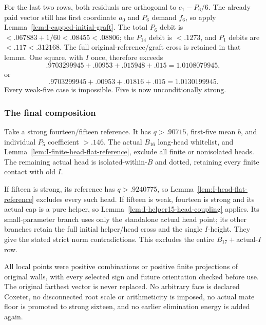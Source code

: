 For the last two rows, both residuals are orthogonal to
\(e_1-P_6/6\). The already paid vector still has first coordinate
\(a_0\) and \(P_6\) demand \(f_6\), so apply
Lemma~\ref{lem:I-capped-initial-graft}.
The total \(P_6\) debit is
\(<.067883+1/60<.08455<.08806\); the \(P_{14}\) debit
is \(<.1273\), and \(P_1\) debits are \(<.117<.312168\).
The full original-reference/graft cross is retained in that lemma.
One square, with \(I\) once, therefore exceeds
\[
 .9703299945+.00953+.015948+.015=1.0108079945,
\]
or
\[
 .9703299945+.00953+.01816+.015=1.0130199945.
\]
Every weak-five case is impossible. Five is now unconditionally strong.

\subsubsection{The final composition}
Take a strong fourteen/fifteen reference. It has \(q>.90715\),
first-five mean \(b\), and individual \(P_5\) coefficient \(>.146\).
The actual \(B_{16}\) long-head whitelist, and
Lemma~\ref{lem:I-finite-head-flat-reference}, exclude all finite
or nonisolated heads. The remaining actual head is isolated-within-\(B\)
and dotted, retaining every finite contact with old \(I\).

If fifteen is strong, its reference has \(q>.9240775\), so
Lemma~\ref{lem:I-head-flat-reference} excludes every such head.
If fifteen is weak, fourteen is strong and its actual cap is a pure
helper, so Lemma~\ref{lem:I-helper15-head-coupling} applies.
Its small-parameter branch uses only the standalone actual head point;
its other branches retain the full initial helper/head cross and
the single \(I\)-height. They give the stated strict norm contradictions.
This excludes the entire \(B_{17}+\)actual-\(I\) row.

All local points were positive combinations or positive finite
projections of original walls, with every selected sign and future
orientation checked before use. The original farthest vector is never
replaced. No arbitrary face is declared Coxeter, no disconnected root
scale or arithmeticity is imposed, no actual mate floor is promoted to
strong sixteen, and no earlier elimination energy is added again.


